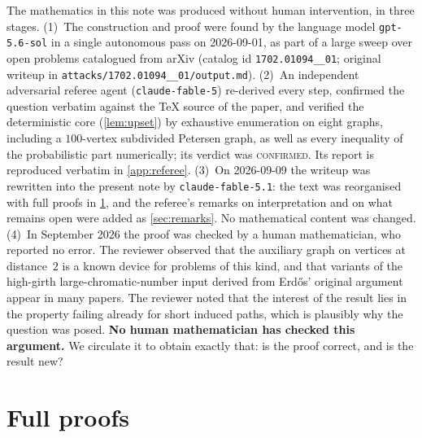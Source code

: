 \documentclass[11pt,a4paper]{article}
\theoremstyle{plain}
\theoremstyle{definition}
\theoremstyle{remark}
\begin{document}
The mathematics in this note was produced without human intervention, in three stages.
(1)~The construction and proof were found by the language model \texttt{gpt-5.6-sol} in a single autonomous pass on 2026-09-01, as part of a large sweep over open problems catalogued from arXiv (catalog id \texttt{1702.01094\_\_01}; original writeup in \texttt{attacks/1702.01094\_\_01/output.md}).
(2)~An independent adversarial referee agent (\texttt{claude-fable-5}) re-derived every step, confirmed the question verbatim against the TeX source of the paper, and verified the deterministic core (\cref{lem:upset}) by exhaustive enumeration on eight graphs, including a $100$-vertex subdivided Petersen graph, as well as every inequality of the probabilistic part numerically; its verdict was \textsc{confirmed}. Its report is reproduced verbatim in \cref{app:referee}.
(3)~On 2026-09-09 the writeup was rewritten into the present note by \texttt{claude-fable-5.1}: the text was reorganised with full proofs in \cref{app:proofs}, and the referee's remarks on interpretation and on what remains open were added as \cref{sec:remarks}. No mathematical content was changed.
(4)~In September 2026 the proof was checked by a human mathematician, who reported no error. The reviewer observed that the auxiliary graph on vertices at distance~$2$ is a known device for problems of this kind, and that variants of the high-girth large-chromatic-number input derived from Erd\H{o}s' original argument appear in many papers. The reviewer noted that the interest of the result lies in the property failing already for short induced paths, which is plausibly why the question was posed.
\textbf{No human mathematician has checked this argument.} We circulate it to obtain exactly that: is the proof correct, and is the result new?


\appendix

\section{Full proofs}\label{app:proofs}
\end{document}
